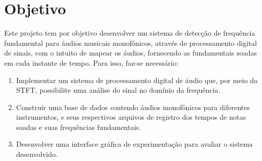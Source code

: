 
\section{Objetivo}
Este projeto tem por objetivo desenvolver um sistema de detecção de frequência fundamental para áudios musicais monofônicos, através de processamento digital de sinais, com o intuito de mapear os áudios, fornecendo as fundamentais soadas em cada instante de tempo.
Para isso, faz-se necessário:
\begin{enumerate}
	\item Implementar um sistema de processamento digital de áudio que, por meio da STFT, possibilite uma análise do sinal no domínio da frequência.
	\item Construir uma base de dados contendo áudios monofônicos para diferentes instrumentos, e seus respectivos arquivos de registro dos tempos de notas soadas e suas frequências fundamentais.
	\item Desenvolver uma interface gráfica de experimentação para avaliar o sistema desenvolvido.
\end{enumerate}

